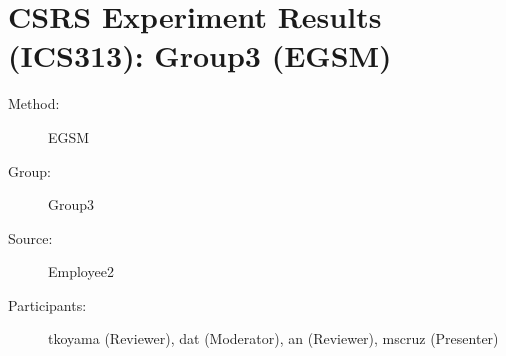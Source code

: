 
%          

\chapter {CSRS Experiment Results (ICS313): Group3 (EGSM)}
\small

\begin{description}
\item [Method:] EGSM
\item [Group:] Group3
\item [Source:] Employee2
\item [Participants:] tkoyama (Reviewer), dat (Moderator), an (Reviewer), mscruz (Presenter)
\end{description}
